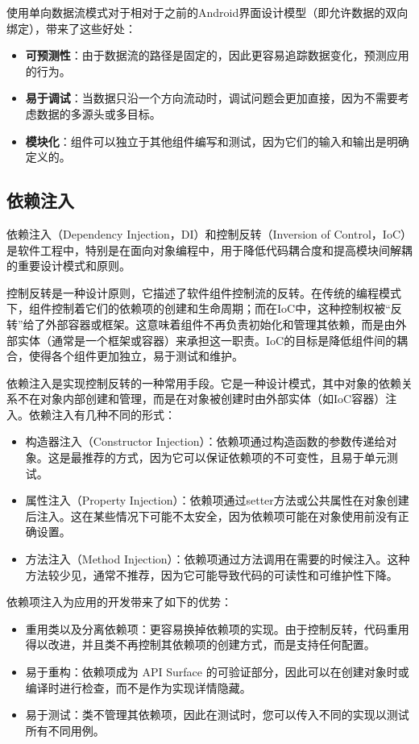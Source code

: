 \documentclass[main.tex]{subfiles}
\begin{document}
使用单向数据流模式对于相对于之前的Android界面设计模型（即允许数据的双向绑定），带来了这些好处：
\begin{itemize}
    \item \textbf{可预测性}：由于数据流的路径是固定的，因此更容易追踪数据变化，预测应用的行为。
    \item \textbf{易于调试}：当数据只沿一个方向流动时，调试问题会更加直接，因为不需要考虑数据的多源头或多目标。
    \item \textbf{模块化}：组件可以独立于其他组件编写和测试，因为它们的输入和输出是明确定义的。
\end{itemize}

\subsection{依赖注入}

依赖注入（Dependency Injection，DI）和控制反转（Inversion of Control，IoC）是软件工程中，特别是在面向对象编程中，用于降低代码耦合度和提高模块间解耦的重要设计模式和原则。

控制反转是一种设计原则，它描述了软件组件控制流的反转。在传统的编程模式下，组件控制着它们的依赖项的创建和生命周期；而在IoC中，这种控制权被“反转”给了外部容器或框架。这意味着组件不再负责初始化和管理其依赖，而是由外部实体（通常是一个框架或容器）来承担这一职责。IoC的目标是降低组件间的耦合，使得各个组件更加独立，易于测试和维护。

依赖注入是实现控制反转的一种常用手段。它是一种设计模式，其中对象的依赖关系不在对象内部创建和管理，而是在对象被创建时由外部实体（如IoC容器）注入。依赖注入有几种不同的形式：

\begin{itemize}
    \item 构造器注入（Constructor Injection）：依赖项通过构造函数的参数传递给对象。这是最推荐的方式，因为它可以保证依赖项的不可变性，且易于单元测试。
    \item 属性注入（Property Injection）：依赖项通过setter方法或公共属性在对象创建后注入。这在某些情况下可能不太安全，因为依赖项可能在对象使用前没有正确设置。
    \item 方法注入（Method Injection）：依赖项通过方法调用在需要的时候注入。这种方法较少见，通常不推荐，因为它可能导致代码的可读性和可维护性下降。
\end{itemize}

依赖项注入为应用的开发带来了如下的优势：

\begin{itemize}
    \item 重用类以及分离依赖项：更容易换掉依赖项的实现。由于控制反转，代码重用得以改进，并且类不再控制其依赖项的创建方式，而是支持任何配置。
    \item 易于重构：依赖项成为 API Surface 的可验证部分，因此可以在创建对象时或编译时进行检查，而不是作为实现详情隐藏。
    \item 易于测试：类不管理其依赖项，因此在测试时，您可以传入不同的实现以测试所有不同用例。
\end{itemize}
\end{document}
